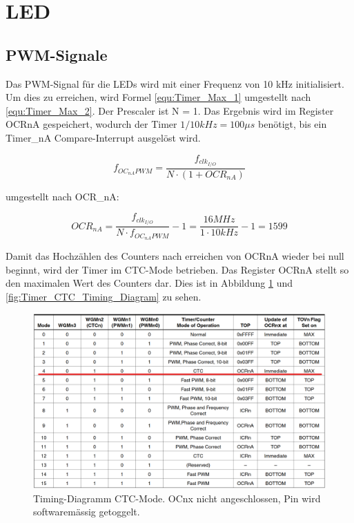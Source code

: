\section{LED}
\subsection{PWM-Signale}\label{Appendix:Timer_PWM}

Das PWM-Signal für die LEDs wird mit einer Frequenz von 10 kHz initialisiert. Um dies zu erreichen, wird Formel \ref{equ:Timer_Max_1} umgestellt nach \ref{equ:Timer_Max_2}. Der Prescaler ist N = 1. Das Ergebnis wird im Register OCRnA gespeichert, wodurch der Timer $1/10kHz = 100\mu s$ benötigt, bis ein Timer\_nA Compare-Interrupt ausgelöst wird. \cite[S.148]{atmel_atmel_2014}

\begin{equation}
f_{OC_{nA}PWM} = \frac{f_{clk_{I/O}}}{N \cdot (1+OCR_{nA})}
\label{equ:Timer_Max_1}
\end{equation}

umgestellt nach OCR\_nA:

\begin{equation}
OCR_{nA} = \frac{f_{clk_{I/O}}}{N \cdot f_{OC_{nA}PWM}} - 1 = \frac{16MHz}{1 \cdot 10kHz} - 1 = 1599
\label{equ:Timer_Max_2}
\end{equation}

Damit das Hochzählen des Counters nach erreichen von OCRnA wieder bei null beginnt, wird der Timer im CTC-Mode betrieben. Das Register OCRnA stellt so den maximalen Wert des Counters dar. Dies ist in Abbildung \ref {fig:Timer_CTC_Mode} und \ref{fig:Timer_CTC_Timing_Diagram} zu sehen.

\begin{figure}[H]
	\centering
	\includegraphics[width=\textwidth]{graphics/Timer_CTC_Mode}
	\caption{Timing-Diagramm CTC-Mode. OCnx nicht angeschlossen, Pin wird softwaremässig getoggelt.\cite[S.145]{atmel_atmel_2014}}
	\label{fig:Timer_CTC_Mode}
\end{figure}


